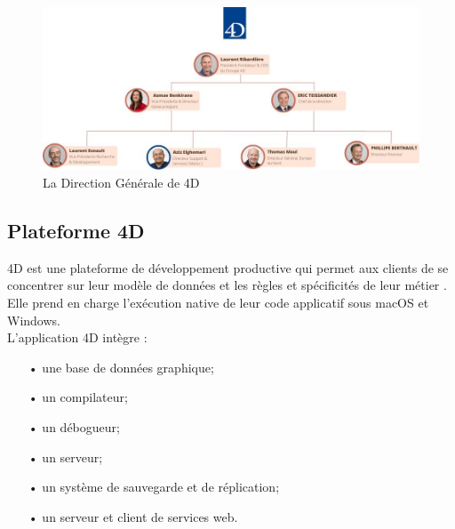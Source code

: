 \begin{figure}[h]
    \centering
    \includegraphics[scale=0.35]{Images/direction.jpg} %
    \caption{La Direction Générale de 4D\cite{4d}}
    \label{fig:direction}
\end{figure}

\subsection{Plateforme 4D}
4D est une plateforme de développement productive qui permet aux clients de se concentrer 
sur leur modèle de données et les règles et spécificités de leur métier \cite{4d}. 
Elle prend en charge l’exécution native de leur code applicatif sous macOS et Windows. 
\\
L'application 4D intègre :
\begin{spacing}{1.2}
    \begin{itemize}
        \item[•] une base de données graphique;
        \item[•] un compilateur;
        \item[•] un débogueur;
        \item[•] un serveur;
        \item[•] un système de sauvegarde et de réplication;
        \item[•] un serveur et client de services web.\\
    \end{itemize}    
\end{spacing}


